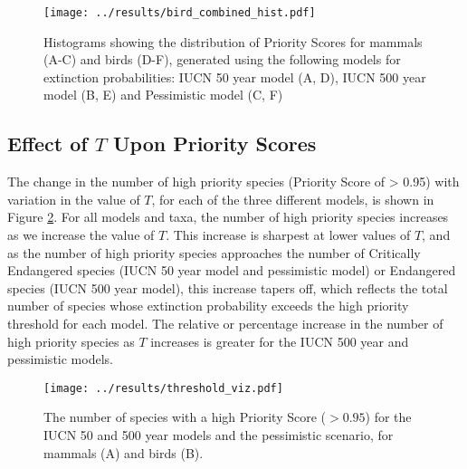 \documentclass[12pt]{article}
\begin{document}
	\begin{figure}
		\texttt{[image: ../results/bird\_combined\_hist.pdf]}
		\caption{Histograms showing the distribution of Priority Scores for
		mammals (A-C) and birds (D-F), generated using the following models for
		extinction probabilities: IUCN 50 year model (A, D), IUCN 500 year
		model (B, E) and Pessimistic model (C, F)}\label{bird_hist}
	\end{figure}

	\subsection{Effect of $T$ Upon Priority Scores}
	The change in the number of high priority species (Priority Score of > 0.95)
	with variation in the value of $T$, for each of the three different models, is
	shown in Figure \ref{thresh_viz}. For all models and taxa, the number of high
	priority species increases as we increase the value of $T$. This increase
	is sharpest at lower values of $T$, and as the number of high priority
	species approaches the number of Critically Endangered species (IUCN 
	50 year model and pessimistic model) or Endangered species (IUCN 500 year
	model), this increase tapers off, which reflects the total number of species
	whose extinction probability exceeds the high priority threshold for
	each model. The relative or percentage increase in the number of high
	priority species as $T$ increases
	is greater for the IUCN 500 year and pessimistic models.
	
	\begin{figure}
		\texttt{[image: ../results/threshold\_viz.pdf]}
		\caption{The number of species with a high Priority Score ($> 0.95$)
			for the IUCN 50 and 500 year models and the pessimistic scenario, for 
			mammals (A) and birds (B).}\label{thresh_viz}
	\end{figure}
	
\end{document}
